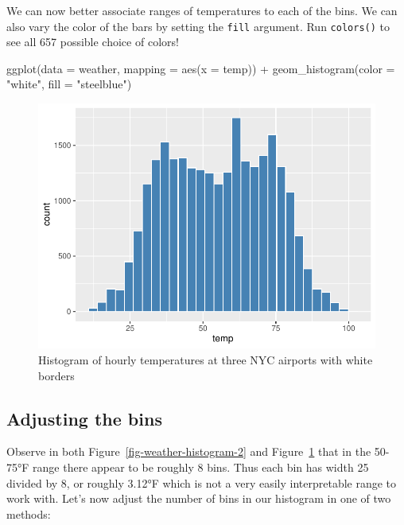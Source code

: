 \documentclass[
  letterpaper,
  DIV=11,
  numbers=noendperiod]{scrreprt}
\newenvironment{Shaded}{\begin{snugshade}}{\end{snugshade}}
\newcommand{\AttributeTok}[1]{\textcolor[rgb]{0.40,0.45,0.13}{#1}}
\newcommand{\FunctionTok}[1]{\textcolor[rgb]{0.28,0.35,0.67}{#1}}
\newcommand{\NormalTok}[1]{\textcolor[rgb]{0.00,0.23,0.31}{#1}}
\newcommand{\SpecialCharTok}[1]{\textcolor[rgb]{0.37,0.37,0.37}{#1}}
\newcommand{\StringTok}[1]{\textcolor[rgb]{0.13,0.47,0.30}{#1}}
\theoremstyle{definition}
\theoremstyle{remark}
\begin{document}
We can now better associate ranges of temperatures to each of the bins.
We can also vary the color of the bars by setting the \texttt{fill}
argument. Run \texttt{colors()} to see all 657 possible choice of
colors!

\begin{Shaded}
\begin{Highlighting}[]
\FunctionTok{ggplot}\NormalTok{(}\AttributeTok{data =}\NormalTok{ weather, }\AttributeTok{mapping =} \FunctionTok{aes}\NormalTok{(}\AttributeTok{x =}\NormalTok{ temp)) }\SpecialCharTok{+}
  \FunctionTok{geom\_histogram}\NormalTok{(}\AttributeTok{color =} \StringTok{"white"}\NormalTok{, }\AttributeTok{fill =} \StringTok{"steelblue"}\NormalTok{)}
\end{Highlighting}
\end{Shaded}

\begin{figure}[H]

{\centering \includegraphics{02-visualization_files/figure-pdf/fig-weather-histogram-3-1.pdf}

}

\caption{\label{fig-weather-histogram-3}Histogram of hourly temperatures
at three NYC airports with white borders}

\end{figure}

\hypertarget{sec-adjustbins}{%
\subsection{Adjusting the bins}\label{sec-adjustbins}}

Observe in both Figure~\ref{fig-weather-histogram-2} and
Figure~\ref{fig-weather-histogram-3} that in the 50-75°F range there
appear to be roughly 8 bins. Thus each bin has width 25 divided by 8, or
roughly 3.12°F which is not a very easily interpretable range to work
with. Let's now adjust the number of bins in our histogram in one of two
methods:
\end{document}
